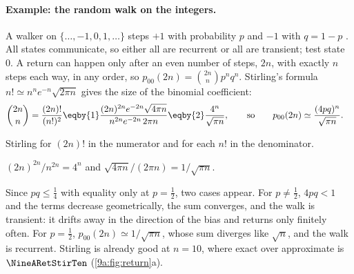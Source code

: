 \paragraph{Example: the random walk on the integers.}
A walker on $\{\dots,-1,0,1,\dots\}$ steps $+1$ with probability $p$ and $-1$ with $q=1-p$
. All states communicate, so either all are recurrent or all are
transient; test state 0. A return can happen only after an even number of steps, $2n$, with
exactly $n$ steps each way, in any order, so $p_{00}(2n)=\binom{2n}{n}p^nq^n$. Stirling's
formula $n!\simeq n^n e^{-n}\sqrt{2\pi n}$ gives the size of the binomial coefficient:
\begin{align}
  \binom{2n}{n}=\frac{(2n)!}{(n!)^2}
  &\eqby{1}\frac{(2n)^{2n}e^{-2n}\sqrt{4\pi n}}{n^{2n}e^{-2n}\,2\pi n}
   \eqby{2}\frac{4^n}{\sqrt{\pi n}},
  \qquad\text{so}\qquad
  p_{00}(2n)\simeq\frac{(4pq)^n}{\sqrt{\pi n}} .
  \label{9a:eq:stirling-walk}
\end{align}
\begin{explain}
  \item Stirling for $(2n)!$ in the numerator and for each $n!$ in the denominator.
  \item $(2n)^{2n}/n^{2n}=4^n$ and $\sqrt{4\pi n}/(2\pi n)=1/\sqrt{\pi n}$.
\end{explain}
Since $pq\le\tfrac14$ with equality only at $p=\tfrac12$, two cases appear. For $p\ne\tfrac12$,
$4pq<1$ and the terms decrease geometrically, the sum converges, and the walk is transient: it
drifts away in the direction of the bias and returns only finitely often. For $p=\tfrac12$,
$p_{00}(2n)\simeq1/\sqrt{\pi n}$, whose sum diverges like $\sqrt n$, and the walk is
recurrent. Stirling is already good at $n=10$, where exact over approximate is
$\NineARetStirTen$ (\cref{9a:fig:return}a).

